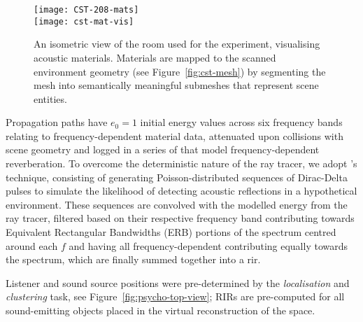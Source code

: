 \begin{figure}[htbp]
    \centering
    \texttt{[image: CST-208-mats]} \\
    \texttt{[image: cst-mat-vis]}
    \caption[Acoustic material visualisation of space for psychoacoustic testing]{An isometric view of the room used for the experiment, visualising acoustic materials. Materials are mapped to the scanned environment geometry (see Figure~\ref{fig:cst-mesh}) by segmenting the mesh into semantically meaningful submeshes that represent scene entities.}\label{fig:cst-208-materials}
\end{figure}
Propagation paths have $e_0 = 1$ initial energy values across six frequency bands relating to frequency-dependent material data, attenuated upon collisions with scene geometry and logged in a series of  that model frequency-dependent reverberation. To overcome the deterministic nature of the ray tracer, we adopt \cite{schroder2011physically}'s technique, consisting of generating Poisson-distributed sequences of Dirac-Delta pulses to simulate the likelihood of detecting acoustic reflections in a hypothetical environment. These sequences are convolved with the modelled energy from the ray tracer, filtered based on their respective frequency band contributing towards Equivalent Rectangular Bandwidths (ERB) portions of the spectrum centred around each $f$ and having all frequency-dependent  contributing equally towards the spectrum, which are finally summed together into a \acrshort{rir}.\par
Listener and sound source positions were pre-determined by the \emph{localisation} and \emph{clustering} task, see Figure~\ref{fig:psycho-top-view}; RIRs are pre-computed for all sound-emitting objects placed in the virtual reconstruction of the space.

